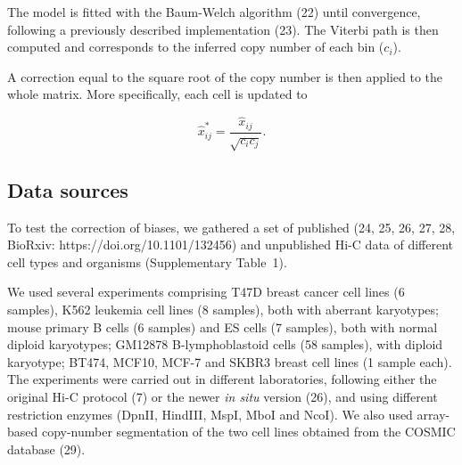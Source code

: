 \documentclass[a4,center,fleqn]{NAR}
\providecommand{\DIFadd}[1]{{\protect\color{red}#1}} %
\providecommand{\DIFdel}[1]{{\protect}}                      %
\providecommand{\DIFaddbegin}{} %
\providecommand{\DIFaddend}{} %
\providecommand{\DIFdelbegin}{} %
\providecommand{\DIFdelend}{} %
\begin{document}
The model is fitted with the Baum-Welch algorithm (22) until
convergence, following a previously described implementation
(23).  The Viterbi path is then computed and
corresponds to the inferred copy number of each bin ($c_i$).

A correction equal to the square root of the copy number is then applied
to the whole matrix. More specifically, each cell is updated to

\begin{equation}
\label{eq:cnvnorm}
\hat{x}_{ij}^* = \frac{\hat{x}_{ij}}{\sqrt{c_ic_j}}.
\end{equation}


\subsection{Data sources}

To test the correction of biases, we gathered a set of
published (24, 25, 26, 27, 28, \DIFdelbegin \DIFdel{29}\DIFdelend \DIFaddbegin \DIFadd{BioRxiv: https://doi.org/10.1101/132456}\DIFaddend ) and
unpublished Hi-C data of different cell types and organisms
(\DIFdelbegin \DIFdel{Table \ref{tab:samples}}\DIFdelend \DIFaddbegin \DIFadd{Supplementary Table~1}\DIFaddend ).

We used several experiments comprising T47D breast cancer cell lines (\DIFdelbegin \DIFdel{7
}\DIFdelend \DIFaddbegin \DIFadd{6
}\DIFaddend samples), K562 leukemia cell lines (\DIFdelbegin \DIFdel{4 }\DIFdelend \DIFaddbegin \DIFadd{8 }\DIFaddend samples), both with aberrant
karyotypes; \DIFdelbegin \DIFdel{and }\DIFdelend mouse primary B cells (6 samples) and ES cells (7
samples), both with normal diploid karyotypes\DIFaddbegin \DIFadd{; GM12878 B-lymphoblastoid cells
(58 samples), with diploid karyotype; BT474, MCF10, MCF-7 and SKBR3 breast cell
lines (1 sample each)}\DIFaddend . The experiments were
carried out in different laboratories, following either the original Hi-C
protocol (7) or the newer \textit{in situ}
version (26), and using different restriction enzymes (DpnII,
HindIII, \DIFaddbegin \DIFadd{MspI, }\DIFaddend MboI and NcoI). We also used array-based copy-number
segmentation of the two cell lines obtained from the COSMIC database
(\DIFdelbegin \DIFdel{30}\DIFdelend \DIFaddbegin \DIFadd{29}\DIFaddend ).


\DIFdelbegin %
\end{document}
